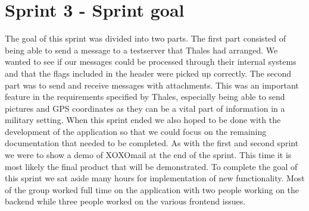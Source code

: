 \section{Sprint 3 - Sprint goal}
The goal of this sprint was divided into two parts. The first part consisted of being able to send a message to a testserver that Thales had arranged. We wanted to see if our messages could be processed through their internal systems and that the flags included in the header were picked up correctly. The second part was to send and receive messages with attachments. This was an important feature in the requirements specified by Thales, especially being able to send pictures and GPS coordinates as they can be a vital part of information in a military setting.
\newline
\newline
When this sprint ended we also hoped to be done with the development of the application so that we could focus on the remaining documentation that needed to be completed. As with the first and second sprint we were to show a demo of XOXOmail at the end of the sprint. This time it is most likely the final product that will be demonstrated.
\newline
\newline
To complete the goal of this sprint we sat aside many hours for implementation of new functionality. Most of the group worked full time on the application with two people working on the backend while three people worked on the various frontend issues.